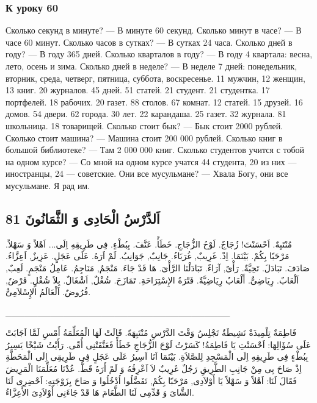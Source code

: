 \documentclass[a5paper]{article}
\begin{document}
\subsubsection[К уроку 60]{К уроку 60}
Сколько секунд в минуте? — В минуте 60 секунд. Сколько минут в часе? — В часе 60 минут. Сколько часов в сутках? — В сутках 24 часа. Сколько дней в году? — В году 365 дней. Сколько кварталов в году? — В году 4 квартала: весна, лето, осень и зима. Сколько дней в неделе? — В неделе 7 дней: понедельник, вторник, среда, четверг, пятница, суббота, воскресенье. 11 мужчин, 12 женщин, 13 книг. 20 журналов. 45 дней. 51 статей. 21 студент. 21 студентка. 17 портфелей. 18 рабочих. 20 газет. 88 столов. 67 комнат. 12 статей. 15 друзей. 16 домов. 54 двери. 62 города. 30 лет. 22 карандаша. 25 газет. 32 журнала. 81 школьница. 18 товарищей. Сколько стоит бык? — Бык стоит 2000 рублей. Сколько стоит машина? — Машина стоит 200 000 рублей. Сколько книг в большой библиотеке? — Там 2 000 000 книг. Сколько студентов учится с тобой на одном курсе? — Со мной на одном курсе учатся 44 студента, 20 из них — иностранцы, 24 — советские. Они все мусульмане? — Хвала Богу, они все мусульмане. Я рад им.

\subsection{اَلدَّرْسُ الْحَادِى وَ الثَّمَانُونَ 81}
مُنْتَبِهٌ. اَحْسَنْتَ! زُجَاجٌ. لَوْحُ الزُّجَاجِ. خَطَأً. عَنَّفَ. بِبُطْءٍ. فِى طَرِيقِهِ اِلَى... اَهْلاً وَ سَهْلاً. مَرْحَبًا بِكُمْ. بَيْنَمَا. اِذْ. غَرِيبٌ, غُرَبَاءُ. جَانِبٌ, جَوَانِبُ. لَمْ اَرَهُ. عَلَى عَجَلٍ. عَزِيزٌ, اَعِزَّاءُ. صَادَفَ. تَبَادَلَ. تَحِيَّةٌ. رَأْىٌ, آرَاءٌ. تَبَادَلْنَا الرَّأْىَ. هَا قَدْ جَاءَ. مَنْجَمٌ, مَنَاجِمُ. عَامِلُ مَنْجَمٍ. لَعِبٌ, اَلْعَابٌ. رِيَاضِىٌّ. أَلْعَابٌ رِيَاضِيَّةٌ. فَتْرَةُ الإِسْتِرَاحَةِ. تَمَازَحَ. شُغْلٌ, اَشْغَالٌ. بِلاَ شُغْلٍ. فَرْضٌ, فُرُوضٌ. اَلْعَالَمُ الإِسْلاَمِىُّ. 

\_\_\_\_\_\_\_\_\_\_\_\_\_\_\_\_\_\_\_\_\_\_\_\_\_\_\_\_\_\_\_\_\_\_\_

فَاطِمَةٌ تِلْمِيذَةٌ نَشِيطَةٌ تَجْلِسُ وَقْتَ الدَّرْسِ مُنْتَبِهَةً. قَالَتْ لَهَا الْمُعَلِّمَةُ أَمْسِ لَمَّا اَجَابَتْ عَلَى سُؤَالِهَا: اَحْسَنْتِ يَا فَاطِمَةُ! كَسَرْتُ لَوْحَ الزُّجَاجِ خَطَأً فَعَنَّفَتْنِى أُمِّى. رَأَيْتُ شَيْخًا يَسِيرُ بِبُطْءٍ فِى طَرِيقِهِ اِلَى الْمَسْجِدِ لِلصَّلاَةِ. بَيْنَمَا اَنَا اَسِيرُ عَلَى عَجَلٍ فِى طَرِيقِى اِلَى الْمَحَطَّةِ اِذْ صَاحَ بِى مِنْ جَانِبِ الطَّرِيقِ رَجُلٌ غَرِيبٌ لاَ اَعْرِفُهُ وَ لَمْ أَرَهُ قَطُّ. عُدْنَا مُعَلِّمَنَا الْمَرِيضَ فَقَالَ لَنَا: اَهْلاً وَ سَهْلاً يَا أَوْلاَدِى, مَرْحَبًا بِكُمْ, تَفَضَّلُوا اُدْخُلُوا وَ صَاحَ بِزَوْجَتِهِ: اَحْضِرِى لَنَا الشَّاىَ وَ قَدِّمِى لَنَا الطَّعَامَ هَا قَدْ جَاءَنِى أَوْلاَدِىَ الأَعِزَّاءُ.
\end{document}
